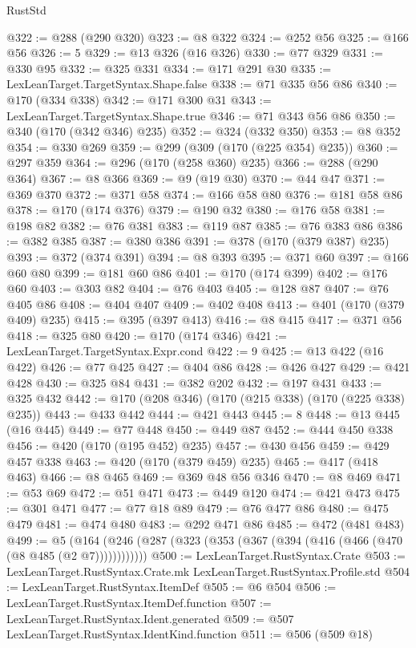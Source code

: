 \begin{lexlean}{RustStd}
\begin{coremodule}
@322 := @288 (@290 @320)
@323 := @8 @322
@324 := @252 @56
@325 := @166 @56
@326 := 5
@329 := @13 @326 (@16 @326)
@330 := @77 @329
@331 := @330 @95
@332 := @325 @331
@334 := @171 @291 @30
@335 := LexLeanTarget.TargetSyntax.Shape.false
@338 := @71 @335 @56 @86
@340 := @170 (@334 @338)
@342 := @171 @300 @31
@343 := LexLeanTarget.TargetSyntax.Shape.true
@346 := @71 @343 @56 @86
@350 := @340 (@170 (@342 @346) @235)
@352 := @324 (@332 @350)
@353 := @8 @352
@354 := @330 @269
@359 := @299 (@309 (@170 (@225 @354) @235))
@360 := @297 @359
@364 := @296 (@170 (@258 @360) @235)
@366 := @288 (@290 @364)
@367 := @8 @366
@369 := @9 (@19 @30)
@370 := @44 @47
@371 := @369 @370
@372 := @371 @58
@374 := @166 @58 @80
@376 := @181 @58 @86
@378 := @170 (@174 @376)
@379 := @190 @32
@380 := @176 @58
@381 := @198 @82
@382 := @76 @381
@383 := @119 @87
@385 := @76 @383 @86
@386 := @382 @385
@387 := @380 @386
@391 := @378 (@170 (@379 @387) @235)
@393 := @372 (@374 @391)
@394 := @8 @393
@395 := @371 @60
@397 := @166 @60 @80
@399 := @181 @60 @86
@401 := @170 (@174 @399)
@402 := @176 @60
@403 := @303 @82
@404 := @76 @403
@405 := @128 @87
@407 := @76 @405 @86
@408 := @404 @407
@409 := @402 @408
@413 := @401 (@170 (@379 @409) @235)
@415 := @395 (@397 @413)
@416 := @8 @415
@417 := @371 @56
@418 := @325 @80
@420 := @170 (@174 @346)
@421 := LexLeanTarget.TargetSyntax.Expr.cond
@422 := 9
@425 := @13 @422 (@16 @422)
@426 := @77 @425
@427 := @404 @86
@428 := @426 @427
@429 := @421 @428
@430 := @325 @84
@431 := @382 @202
@432 := @197 @431
@433 := @325 @432
@442 := @170 (@208 @346) (@170 (@215 @338) (@170 (@225 @338) @235))
@443 := @433 @442
@444 := @421 @443
@445 := 8
@448 := @13 @445 (@16 @445)
@449 := @77 @448
@450 := @449 @87
@452 := @444 @450 @338
@456 := @420 (@170 (@195 @452) @235)
@457 := @430 @456
@459 := @429 @457 @338
@463 := @420 (@170 (@379 @459) @235)
@465 := @417 (@418 @463)
@466 := @8 @465
@469 := @369 @48 @56 @346
@470 := @8 @469
@471 := @53 @69
@472 := @51 @471
@473 := @449 @120
@474 := @421 @473
@475 := @301 @471
@477 := @77 @18 @89
@479 := @76 @477 @86
@480 := @475 @479
@481 := @474 @480
@483 := @292 @471 @86
@485 := @472 (@481 @483)
@499 := @5 (@164 (@246 (@287 (@323 (@353 (@367 (@394 (@416 (@466 (@470 (@8 @485 (@2 @7))))))))))))
@500 := LexLeanTarget.RustSyntax.Crate
@503 := LexLeanTarget.RustSyntax.Crate.mk LexLeanTarget.RustSyntax.Profile.std
@504 := LexLeanTarget.RustSyntax.ItemDef
@505 := @6 @504
@506 := LexLeanTarget.RustSyntax.ItemDef.function
@507 := LexLeanTarget.RustSyntax.Ident.generated
@509 := @507 LexLeanTarget.RustSyntax.IdentKind.function
@511 := @506 (@509 @18)

\end{coremodule}
\end{lexlean}
